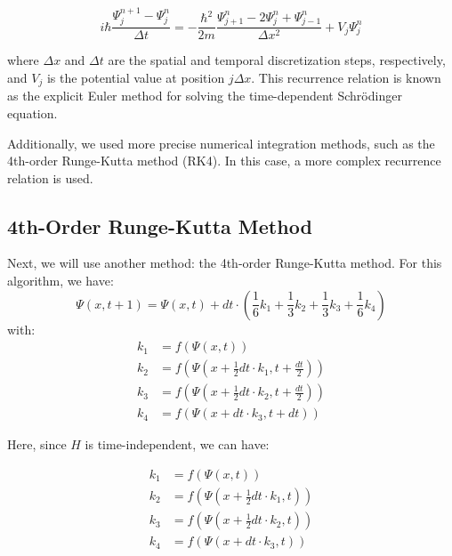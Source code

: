 \documentclass[12pt,french]{article}
\begin{document}
$$i\hbar\frac{\Psi_j^{n+1}-\Psi_j^{n}}{\Delta t} = -\frac{\hbar^2}{2m}\frac{\Psi_{j+1}^{n}-2\Psi_j^{n}+\Psi_{j-1}^{n}}{\Delta x^2} + V_j\Psi_j^{n}$$



where $\Delta x$ and $\Delta t$ are the spatial and temporal discretization steps, respectively, and $V_j$ is the potential value at position $j\Delta x$. This recurrence relation is known as the explicit Euler method for solving the time-dependent Schrödinger equation.

Additionally, we used more precise numerical integration methods, such as the 4th-order Runge-Kutta method (RK4). In this case, a more complex recurrence relation is used.

\subsection{4th-Order Runge-Kutta Method}

Next, we will use another method: the 4th-order Runge-Kutta method. For this algorithm, we have:
\begin{equation}
    \Psi(x,t+1) = \Psi(x,t) + dt \cdot \left(\frac{1}{6}k_1 + \frac{1}{3}k_2 + \frac{1}{3}k_3 + \frac{1}{6}k_4\right)
\end{equation}
with:
\begin{align*}
    k_1 &= f(\Psi(x,t))\\
    k_2 &= f\left(\Psi\left(x + \frac{1}{2} dt \cdot k_1 ,t + \frac{dt}{2}\right)\right) \\
    k_3 &= f\left(\Psi\left(x + \frac{1}{2} dt \cdot k_2 ,t + \frac{dt}{2}\right)\right)\\
    k_4 &= f(\Psi(x+ dt \cdot k_3,t+dt))
\end{align*}

Here, since $H$ is time-independent, we can have:

\begin{align*}
    k_1 &= f(\Psi(x,t))\\
    k_2 &= f\left(\Psi\left(x + \frac{1}{2} dt \cdot k_1 ,t\right)\right) \\
    k_3 &= f\left(\Psi\left(x + \frac{1}{2} dt \cdot k_2 ,t\right)\right)\\
    k_4 &= f(\Psi(x+ dt \cdot k_3,t))
\end{align*}
\end{document}
